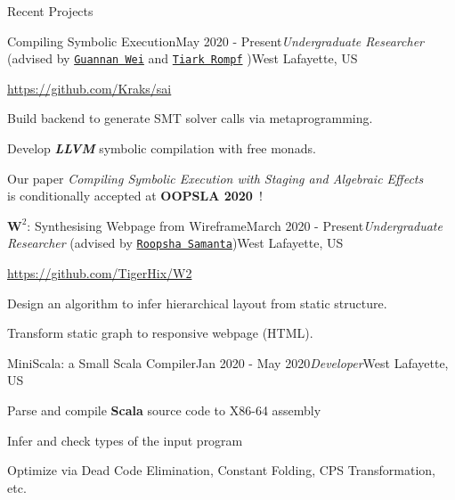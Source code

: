 \documentclass{resume} %
\begin{document}
\begin{rSection}{Recent Projects}

\begin{rSubsection}{Compiling Symbolic Execution}{May 2020 - Present}{\textit{Undergraduate Researcher} (advised by \href{http://continuation.passing.style/}{\texttt{Guannan Wei}} and \href{http://tiarkrompf.github.io/}{\texttt{Tiark Rompf}} )}{West Lafayette, US}
\item \url{https://github.com/Kraks/sai}
\item Build backend to generate SMT solver calls via metaprogramming.
\item Develop \textbf{\it LLVM} symbolic compilation with free monads. 
\item Our paper \textit{Compiling Symbolic Execution with Staging and Algebraic Effects}\\is conditionally accepted at \textbf{OOPSLA 2020}\ !
\end{rSubsection}


\begin{rSubsection}{$\mathbf{W}^2$: Synthesising Webpage from Wireframe}{March 2020 - Present}{\textit{Undergraduate Researcher} (advised by \href{https://www.cs.purdue.edu/homes/roopsha/}{\texttt{Roopsha Samanta}})}{West Lafayette, US}
\item \url{https://github.com/TigerHix/W2}
\item Design an algorithm to infer hierarchical layout from static structure.
\item Transform static graph to responsive webpage (HTML).

\end{rSubsection}

\begin{rSubsection}{MiniScala: a Small Scala Compiler}{Jan 2020 - May 2020}{\textit{Developer}}{West Lafayette, US}
\item Parse and compile \textbf{Scala} source code to X86-64 assembly
\item Infer and check types of the input program
\item Optimize via Dead Code Elimination, Constant Folding, CPS Transformation, etc.

\end{rSubsection}


\end{rSection}
\end{document}
